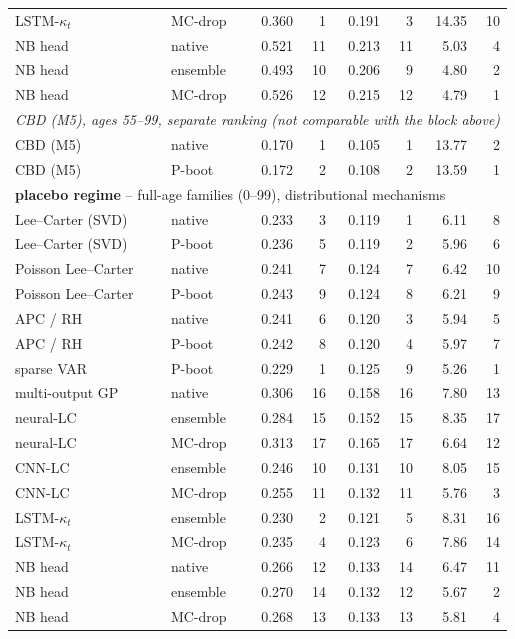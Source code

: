 {\begin{longtable}{@{}llrrrrrr@{}}
LSTM-$\kappa_t$ & MC-drop & 0.360 & 1 & 0.191 & 3 & 14.35 & 10 \\
NB head & native & 0.521 & 11 & 0.213 & 11 & 5.03 & 4 \\
NB head & ensemble & 0.493 & 10 & 0.206 & 9 & 4.80 & 2 \\
NB head & MC-drop & 0.526 & 12 & 0.215 & 12 & 4.79 & 1 \\
\multicolumn{8}{l}{\emph{CBD (M5), ages 55--99, separate ranking (not comparable with the block above)}} \\
\midrule
CBD (M5) & native & 0.170 & 1 & 0.105 & 1 & 13.77 & 2 \\
CBD (M5) & P-boot & 0.172 & 2 & 0.108 & 2 & 13.59 & 1 \\
\multicolumn{8}{l}{\textbf{placebo regime} -- full-age families (0--99), distributional mechanisms} \\
\midrule
Lee--Carter (SVD) & native & 0.233 & 3 & 0.119 & 1 & 6.11 & 8 \\
Lee--Carter (SVD) & P-boot & 0.236 & 5 & 0.119 & 2 & 5.96 & 6 \\
Poisson Lee--Carter & native & 0.241 & 7 & 0.124 & 7 & 6.42 & 10 \\
Poisson Lee--Carter & P-boot & 0.243 & 9 & 0.124 & 8 & 6.21 & 9 \\
APC / RH & native & 0.241 & 6 & 0.120 & 3 & 5.94 & 5 \\
APC / RH & P-boot & 0.242 & 8 & 0.120 & 4 & 5.97 & 7 \\
sparse VAR & P-boot & 0.229 & 1 & 0.125 & 9 & 5.26 & 1 \\
multi-output GP & native & 0.306 & 16 & 0.158 & 16 & 7.80 & 13 \\
neural-LC & ensemble & 0.284 & 15 & 0.152 & 15 & 8.35 & 17 \\
neural-LC & MC-drop & 0.313 & 17 & 0.165 & 17 & 6.64 & 12 \\
CNN-LC & ensemble & 0.246 & 10 & 0.131 & 10 & 8.05 & 15 \\
CNN-LC & MC-drop & 0.255 & 11 & 0.132 & 11 & 5.76 & 3 \\
LSTM-$\kappa_t$ & ensemble & 0.230 & 2 & 0.121 & 5 & 8.31 & 16 \\
LSTM-$\kappa_t$ & MC-drop & 0.235 & 4 & 0.123 & 6 & 7.86 & 14 \\
NB head & native & 0.266 & 12 & 0.133 & 14 & 6.47 & 11 \\
NB head & ensemble & 0.270 & 14 & 0.132 & 12 & 5.67 & 2 \\
NB head & MC-drop & 0.268 & 13 & 0.133 & 13 & 5.81 & 4 \\

\end{longtable}}

